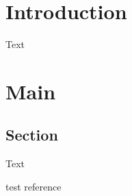 \documentclass[svgnames]{report}
\begin{document}
\tableofcontents


\chapter{Introduction}

Text

\chapter{Main}

\section{Section}

Text

\begin{thebibliography}{99}

 test reference

\end{thebibliography}
\end{document}
